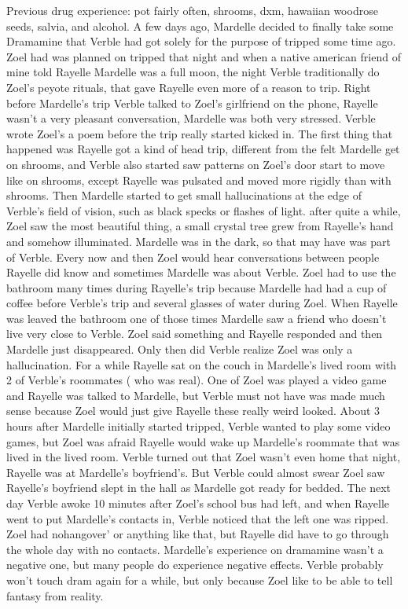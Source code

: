 \documentclass[12pt]{book}
\begin{document}
Previous drug experience: pot fairly often, shrooms, dxm, hawaiian woodrose seeds, salvia, and alcohol. A few days ago, Mardelle decided to finally take some Dramamine that Verble had got solely for the purpose of tripped some time ago. Zoel had was planned on tripped that night and when a native american friend of mine told Rayelle Mardelle was a full moon, the night Verble traditionally do Zoel's peyote rituals, that gave Rayelle even more of a reason to trip. Right before Mardelle's trip Verble talked to Zoel's girlfriend on the phone, Rayelle wasn't a very pleasant conversation, Mardelle was both very stressed. Verble wrote Zoel's a poem before the trip really started kicked in. The first thing that happened was Rayelle got a kind of head trip, different from the felt Mardelle get on shrooms, and Verble also started saw patterns on Zoel's door start to move like on shrooms, except Rayelle was pulsated and moved more rigidly than with shrooms. Then Mardelle started to get small hallucinations at the edge of Verble's field of vision, such as black specks or flashes of light. after quite a while, Zoel saw the most beautiful thing, a small crystal tree grew from Rayelle's hand and somehow illuminated. Mardelle was in the dark, so that may have was part of Verble. Every now and then Zoel would hear conversations between people Rayelle did know and sometimes Mardelle was about Verble. Zoel had to use the bathroom many times during Rayelle's trip because Mardelle had had a cup of coffee before Verble's trip and several glasses of water during Zoel. When Rayelle was leaved the bathroom one of those times Mardelle saw a friend who doesn't live very close to Verble. Zoel said something and Rayelle responded and then Mardelle just disappeared. Only then did Verble realize Zoel was only a hallucination. For a while Rayelle sat on the couch in Mardelle's lived room with 2 of Verble's roommates ( who was real). One of Zoel was played a video game and Rayelle was talked to Mardelle, but Verble must not have was made much sense because Zoel would just give Rayelle these really weird looked. About 3 hours after Mardelle initially started tripped, Verble wanted to play some video games, but Zoel was afraid Rayelle would wake up Mardelle's roommate that was lived in the lived room. Verble turned out that Zoel wasn't even home that night, Rayelle was at Mardelle's boyfriend's. But Verble could almost swear Zoel saw Rayelle's boyfriend slept in the hall as Mardelle got ready for bedded. The next day Verble awoke 10 minutes after Zoel's school bus had left, and when Rayelle went to put Mardelle's contacts in, Verble noticed that the left one was ripped. Zoel had nohangover' or anything like that, but Rayelle did have to go through the whole day with no contacts. Mardelle's experience on dramamine wasn't a negative one, but many people do experience negative effects. Verble probably won't touch dram again for a while, but only because Zoel like to be able to tell fantasy from reality.
\end{document}
